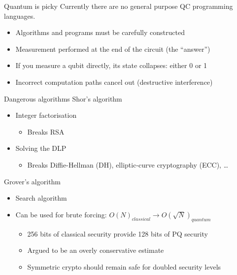 \begin{frame}{Quantum is picky}
  Currently there are no general purpose QC programming languages.
    \begin{itemize}[<+(1)->]
      \item Algorithms and programs must be carefully constructed
      \item Measurement performed at the end of the circuit (the \enquote{answer})
      \item If you measure a qubit directly, its state collapses: either 0 or 1
      \item Incorrect computation paths cancel out (destructive interference)
    \end{itemize}
\end{frame}

\begin{frame}{Dangerous algorithms}
  Shor's algorithm
  \begin{itemize}[<+(1)->]
    \item Integer factorisation
    \begin{itemize}
      \item Breaks RSA
    \end{itemize}
    \item Solving the DLP
    \begin{itemize}
      \item Breaks Diffie-Hellman (DH), elliptic-curve cryptography (ECC), \dots
    \end{itemize}
  \end{itemize}

  \pause

  Grover's algorithm
  \begin{itemize}[<+(1)->]
    \item Search algorithm
    \item Can be used for brute forcing: $O(N)_\mathit{classical} \to O(\sqrt{N})_\mathit{quantum}$
    \begin{itemize}
      \item 256 bits of classical security provide 128 bits of PQ security
      \item Argued to be an overly conservative estimate
      \item Symmetric crypto should remain safe for doubled security levels
    \end{itemize}
  \end{itemize}
\end{frame}

